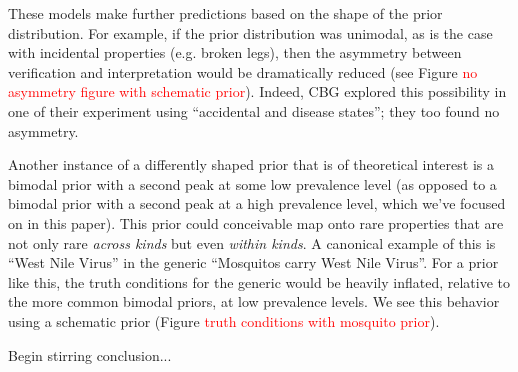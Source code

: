 \documentclass[10pt,letterpaper]{article}
\newcommand{\red}[1]{\textcolor{Red}{#1}}
\begin{document}
These models make further predictions based on the shape of the prior distribution. For example, if the prior distribution was unimodal, as is the case with incidental properties (e.g. broken legs), then the asymmetry between verification and interpretation would be dramatically reduced (see Figure \red{no asymmetry figure with schematic prior}). Indeed, CBG explored this possibility in one of their experiment using ``accidental and disease states''; they too found no asymmetry. 

Another instance of a differently shaped prior that is of theoretical interest is a bimodal prior with a second peak at some low prevalence level (as opposed to a bimodal prior with a second peak at a high prevalence level, which we've focused on in this paper). This prior could conceivable map onto rare properties that are not only rare \emph{across kinds} but even \emph{within kinds}. A canonical example of this is ``West Nile Virus'' in the generic ``Mosquitos carry West Nile Virus''. For a prior like this, the truth conditions for the generic would be heavily inflated, relative to the more common bimodal priors, at low prevalence levels. We see this behavior using a schematic prior (Figure \red{truth conditions with mosquito prior}). 


Begin stirring conclusion...


%
%
%
%
%
%
%
\end{document}
